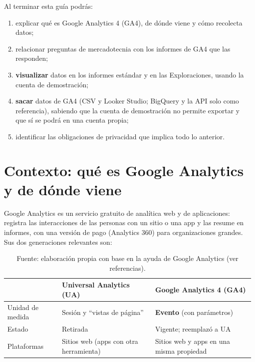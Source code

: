 \documentclass[11pt,letterpaper]{article}
\begin{document}
Al terminar esta guía podrás:
\begin{enumerate}[nosep]
  \item explicar qué es Google Analytics 4 (GA4), de dónde viene y cómo recolecta datos;
  \item relacionar preguntas de mercadotecnia con los informes de GA4 que las responden;
  \item \textbf{visualizar} datos en los informes estándar y en las Exploraciones, usando la cuenta de demostración;
  \item \textbf{sacar} datos de GA4 (CSV y Looker Studio; BigQuery y la API solo como referencia), sabiendo que la cuenta de demostración no permite exportar y que sí se podrá en una cuenta propia;
  \item identificar las obligaciones de privacidad que implica todo lo anterior.
\end{enumerate}

\section{Contexto: qué es Google Analytics y de dónde viene}

Google Analytics es un servicio gratuito de analítica web y de aplicaciones: registra las interacciones de las personas con un sitio o una app y las resume en informes,
con una versión de pago (Analytics 360) para organizaciones grandes. Sus dos generaciones relevantes son:

\begin{table}[h]
\centering
\begin{tabular}{@{}p{3.3cm}p{5.6cm}p{5.6cm}@{}}
\toprule
 & \textbf{Universal Analytics (UA)} & \textbf{Google Analytics 4 (GA4)} \\
\midrule
Unidad de medida & Sesión y \enquote{vistas de página} & \textbf{Evento} (con parámetros) \\
Estado & Retirada & Vigente; reemplazó a UA \\
Plataformas & Sitios web (apps con otra herramienta) & Sitios web y apps en una misma propiedad \\
\bottomrule
\end{tabular}
\caption*{Fuente: elaboración propia con base en la ayuda de Google Analytics (ver referencias).}
\end{table}
\end{document}
